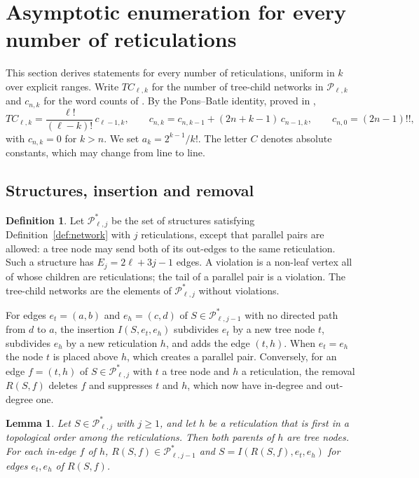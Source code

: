 \documentclass[11pt,a4paper]{article}
\newtheorem{lemma}[theorem]{Lemma}
\theoremstyle{definition}
\newtheorem{definition}[theorem]{Definition}
\newcommand{\cP}{\mathcal{P}}
\begin{document}
\section{Asymptotic enumeration for every number of reticulations}\label{sec:asympt}

This section derives statements for every number of reticulations, uniform in $k$ over explicit ranges. Write $TC_{\ell,k}$ for the number of tree-child networks in $\cP_{\ell,k}$ and $c_{n,k}$ for the word counts of \cite{PonsBatle21}. By the Pons--Batle identity, proved in \cite{Lin26},
\begin{equation}\label{eq:PB}
TC_{\ell,k}=\frac{\ell!}{(\ell-k)!}\,c_{\ell-1,k},\qquad c_{n,k}=c_{n,k-1}+(2n+k-1)\,c_{n-1,k},\qquad c_{n,0}=(2n-1)!!,
\end{equation}
with $c_{n,k}=0$ for $k>n$. We set $a_k=2^{k-1}/k!$. The letter $C$ denotes absolute constants, which may change from line to line.

\subsection{Structures, insertion and removal}

\begin{definition}\label{def:Pstar}
Let $\cP^*_{\ell,j}$ be the set of structures satisfying Definition~\ref{def:network} with $j$ reticulations, except that parallel pairs are allowed: a tree node may send both of its out-edges to the same reticulation. Such a structure has $E_j=2\ell+3j-1$ edges. A violation is a non-leaf vertex all of whose children are reticulations; the tail of a parallel pair is a violation. The tree-child networks are the elements of $\cP^*_{\ell,j}$ without violations.
\end{definition}

For edges $e_t=(a,b)$ and $e_h=(c,d)$ of $S\in\cP^*_{\ell,j-1}$ with no directed path from $d$ to $a$, the insertion $I(S,e_t,e_h)$ subdivides $e_t$ by a new tree node $t$, subdivides $e_h$ by a new reticulation $h$, and adds the edge $(t,h)$. When $e_t=e_h$ the node $t$ is placed above $h$, which creates a parallel pair. Conversely, for an edge $f=(t,h)$ of $S\in\cP^*_{\ell,j}$ with $t$ a tree node and $h$ a reticulation, the removal $R(S,f)$ deletes $f$ and suppresses $t$ and $h$, which now have in-degree and out-degree one.

\begin{lemma}\label{lem:removal}
Let $S\in\cP^*_{\ell,j}$ with $j\ge1$, and let $h$ be a reticulation that is first in a topological order among the reticulations. Then both parents of $h$ are tree nodes. For each in-edge $f$ of $h$, $R(S,f)\in\cP^*_{\ell,j-1}$ and $S=I(R(S,f),e_t,e_h)$ for edges $e_t,e_h$ of $R(S,f)$.
\end{lemma}
\end{document}
